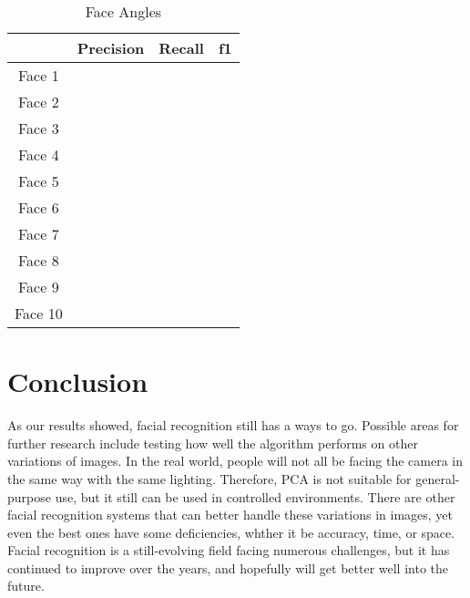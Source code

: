 \documentclass[letterpaper]{article}
\begin{document}
\begin{table}
\caption{Face Angles}
\begin{center}
\label{angles}
\begin {tabular} {|c|c|c|c|}
\hline
& \textrm{Precision} & \textrm{Recall} & \textrm{f1}\\
\hline
Face 1 &  &  &  \\
\hline
Face 2 &  &  &  \\
\hline
Face 3 &  &  &  \\
\hline
Face 4 &  &  &  \\
\hline
Face 5 &  &  &  \\
\hline
Face 6 &  &  &  \\
\hline
Face 7 &  &  &  \\
\hline
Face 8 &  &  &  \\
\hline
Face 9 &  &  &  \\
\hline
Face 10 &  &  &  \\
\hline
\end {tabular}
\end{center}
\end{table}
\section{Conclusion}
As our results showed, facial recognition still has a ways to go. Possible areas for further research include testing how well the algorithm performs on other variations of images.  In the real world, people will not all be facing the camera in the same way with the same lighting.  Therefore, PCA is not suitable for general-purpose use, but it still can be used in controlled environments.  There are other facial recognition systems that can better handle these variations in images, yet even the best ones have some deficiencies, whther it be accuracy, time, or space.  Facial recognition is a still-evolving field facing numerous challenges, but it has continued to improve over the years, and hopefully will get better well into the future.
\end{document}

